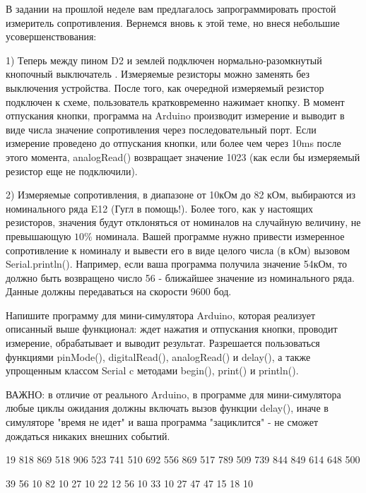 
В задании на прошлой неделе вам предлагалось запрограммировать простой измеритель сопротивления.  
Вернемся вновь к этой теме, но внеся небольшие усовершенствования:  


1) Теперь между пином D2 и землей подключен нормально-разомкнутый кнопочный выключатель .  
Измеряемые резисторы можно заменять без выключения устройства.  После того, как очередной 
измеряемый резистор подключен к схеме, пользователь кратковременно нажимает кнопку. В момент 
отпускания кнопки, программа на Arduino производит измерение и выводит в виде числа значение 
сопротивления через последовательный порт.   Если измерение проведено до отпускания кнопки, 
или более чем через 10ms после этого момента,  analogRead() возвращает значение 1023 
(как если бы измеряемый резистор еще не подключили).  

2) Измеряемые сопротивления, в диапазоне от 10кОм до 82 кОм, выбираются из номинального ряда E12 
(Гугл в помощь!). Более того, как у настоящих резисторов, значения будут отклоняться от 
номиналов на случайную величину, не превышающую $10\%$ номинала.  Вашей программе нужно привести 
измеренное сопротивление к номиналу и вывести его в виде целого числа (в кОм) вызовом Serial.println().  
Например, если ваша программа получила значение 54кОм, то должно быть возвращено число 56 - ближайшее значение из номинального ряда.   Данные должны передаваться на скорости 9600 бод.

Напишите программу для мини-симулятора Arduino, которая реализует описанный выше функционал:  ждет нажатия и отпускания кнопки, проводит измерение, обрабатывает и выводит результат.  Разрешается пользоваться функциями pinMode(),  digitalRead(), analogRead() и delay(),  а также упрощенным классом Serial c методами begin(), print() и println().  

ВАЖНО: в отличие от реального Arduino, в программе для мини-симулятора любые циклы ожидания должны включать вызов функции delay(),  иначе в симуляторе "время не идет" и ваша программа  "зациклится" - не сможет дождаться никаких внешних событий.

\begin{myverbbox}[\small]{\vinput}
    19
    818
    869
    518
    906
    523
    741
    510
    692
    556
    869
    517
    789
    509
    739
    844
    849
    614
    648
    500
\end{myverbbox}
\begin{myverbbox}[\small]{\voutput}
    39
    56
    10
    82
    10
    27
    10
    22
    12
    56
    10
    33
    10
    27
    47
    47
    15
    18
    10
\end{myverbbox}

